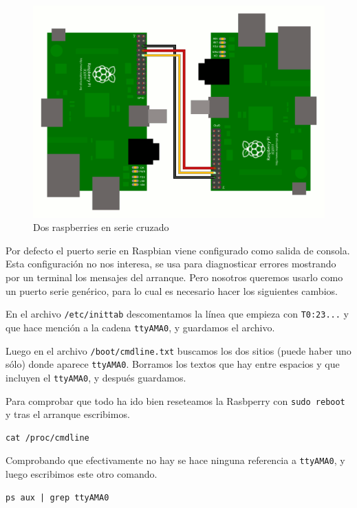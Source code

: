 \begin{figure}[h]
  \centering
    \includegraphics[width=14cm]{graphs/pitopi.png}
  \caption{Dos raspberries en serie cruzado}
  \label{fig:pitopi}
\end{figure}

Por defecto el puerto serie en Raspbian viene configurado como salida de consola. Esta
configuración no nos interesa, se usa para diagnosticar errores mostrando por un terminal
los mensajes del arranque. Pero nosotros queremos usarlo como un puerto serie genérico,
para lo cual es necesario hacer los siguientes cambios.

En el archivo {\tt /etc/inittab} descomentamos la línea que empieza con {\tt T0:23...} y
que hace mención a la cadena {\tt ttyAMA0}, y guardamos el archivo.

Luego en el archivo {\tt /boot/cmdline.txt} buscamos los dos sitios (puede haber uno sólo)
donde aparece {\tt ttyAMA0}. Borramos los textos que hay entre espacios y que incluyen el
{\tt ttyAMA0}, y después guardamos.

Para comprobar que todo ha ido bien reseteamos la Rasbperry con {\tt sudo reboot} y tras
el arranque escribimos.

\begin{lstlisting}
cat /proc/cmdline
\end{lstlisting}

Comprobando que efectivamente no hay se hace ninguna referencia a {\tt ttyAMA0}, y luego
escribimos este otro comando.

\begin{lstlisting}
ps aux | grep ttyAMA0
\end{lstlisting}

